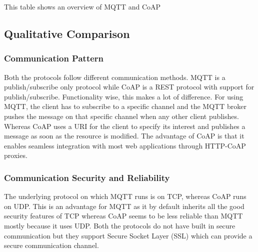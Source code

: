 \documentclass[conference]{IEEEtran}
\begin{document}
This table shows an overview of MQTT and CoAP
\begin{table}[h!]
  \centering
  \caption{Avg Packet Received Ratio}
  \label{tab:MQTT_CoAP_comparison}
\end{table}


\subsection{Qualitative Comparison}

\subsubsection{Communication Pattern}
Both the protocols follow different communication methods. MQTT is a publish/subscribe only protocol while CoAP is a REST protocol with support for publish/subscribe. Functionality wise, this makes a lot of difference. For using MQTT, the client has to subscribe to a specific channel and the MQTT broker pushes the message on that specific channel when any other client publishes. Whereas CoAP uses a URI for the client to specify its interest and publishes a message as soon as the resource is modified. The advantage of CoAP is that it enables seamless integration with most web applications through HTTP-CoAP proxies.

\subsubsection{Communication Security and Reliability}
The underlying protocol on which MQTT runs is on TCP, whereas CoAP runs on UDP. This is an advantage for MQTT as it by default inherits all the good security features of TCP whereas CoAP seems to be less reliable than MQTT mostly because it uses UDP. Both the protocols do not have built in secure communication but they support Secure Socket Layer (SSL) which can provide a secure communication channel.
\end{document}
